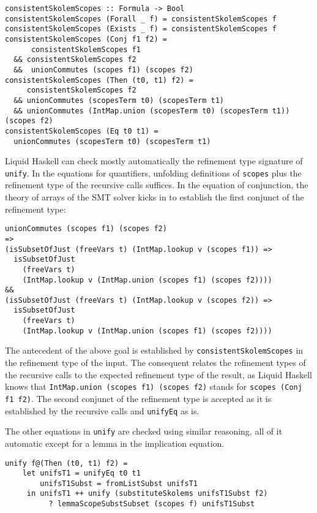 \documentclass[sigconf, anonymous, review]{acmart}
\newcommand{\tc}[1]{{\small\texttt{#1}}}
\begin{document}
\begin{verbatim}
consistentSkolemScopes :: Formula -> Bool
consistentSkolemScopes (Forall _ f) = consistentSkolemScopes f
consistentSkolemScopes (Exists _ f) = consistentSkolemScopes f
consistentSkolemScopes (Conj f1 f2) =
      consistentSkolemScopes f1
  && consistentSkolemScopes f2
  &&  unionCommutes (scopes f1) (scopes f2)
consistentSkolemScopes (Then (t0, t1) f2) =
     consistentSkolemScopes f2
  && unionCommutes (scopesTerm t0) (scopesTerm t1)
  && unionCommutes (IntMap.union (scopesTerm t0) (scopesTerm t1)) (scopes f2)
consistentSkolemScopes (Eq t0 t1) =
  unionCommutes (scopesTerm t0) (scopesTerm t1)
\end{verbatim}

Liquid Haskell can check mostly automatically the refinement type signature of
\tc{unify}. In the equations for quantifiers, unfolding definitions of
\tc{scopes} plus the refinement type of the recursive calls suffices.
In the equation of conjunction, the theory of arrays of the SMT solver
kicks in to establish the first conjunct of the refinement type:

\begin{verbatim}
unionCommutes (scopes f1) (scopes f2)
=>
(isSubsetOfJust (freeVars t) (IntMap.lookup v (scopes f1)) =>
  isSubsetOfJust
    (freeVars t)
    (IntMap.lookup v (IntMap.union (scopes f1) (scopes f2))))
&&
(isSubsetOfJust (freeVars t) (IntMap.lookup v (scopes f2)) =>
  isSubsetOfJust
    (freeVars t)
    (IntMap.lookup v (IntMap.union (scopes f1) (scopes f2))))
\end{verbatim}

The antecedent of the above goal is established by \tc{consistent\-Skolem\-Scopes}
in the refinement type of the input. The consequent relates the refinement types
of the recursive calls to the expected refinement type of the result, as Liquid
Haskell knows that \tc{IntMap.\allowbreak union (scopes f1) (scopes f2)} stands for
\tc{scopes (Conj f1 f2)}. The second conjunct of the refinement type
is accepted as it is established by the recursive calls and \tc{unifyEq}
as is.

The other equations in \tc{unify} are checked using similar reasoning, all of it
automatic except for a lemma in the implication equation.

\begin{verbatim}
unify f@(Then (t0, t1) f2) =
    let unifsT1 = unifyEq t0 t1
        unifsT1Subst = fromListSubst unifsT1
     in unifsT1 ++ unify (substituteSkolems unifsT1Subst f2)
          ? lemmaScopeSubstSubset (scopes f) unifsT1Subst
\end{verbatim}
\end{document}
